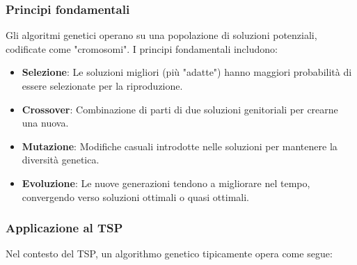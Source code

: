 \subsubsection{Principi fondamentali}

Gli algoritmi genetici operano su una popolazione di soluzioni potenziali, codificate come "cromosomi". I principi fondamentali includono:

\begin{itemize}
	\item \textbf{Selezione}: Le soluzioni migliori (più "adatte") hanno maggiori probabilità di essere selezionate per la riproduzione.
	\item \textbf{Crossover}: Combinazione di parti di due soluzioni genitoriali per crearne una nuova.
	\item \textbf{Mutazione}: Modifiche casuali introdotte nelle soluzioni per mantenere la diversità genetica.
	\item \textbf{Evoluzione}: Le nuove generazioni tendono a migliorare nel tempo, convergendo verso soluzioni ottimali o quasi ottimali.
\end{itemize}

\subsubsection{Applicazione al \gls{TSP}}

Nel contesto del \gls{TSP}, un algorithmo genetico tipicamente opera come segue:

